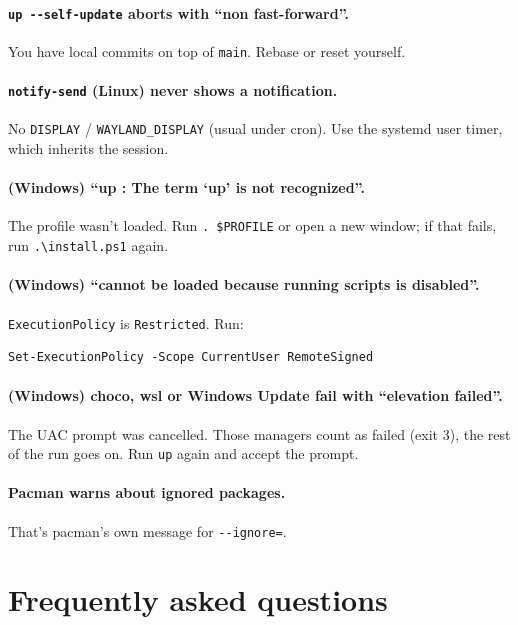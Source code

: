 \documentclass[11pt,a4paper]{article}
\begin{document}
\paragraph{\texttt{up -{}-self-update} aborts with ``non fast-forward''.}
You have local commits on top of \texttt{main}. Rebase or reset yourself.

\paragraph{\texttt{notify-send} (Linux) never shows a notification.}
No \texttt{DISPLAY} / \texttt{WAYLAND\_DISPLAY} (usual under cron). Use
the systemd user timer, which inherits the session.

\paragraph{(Windows) ``up : The term `up' is not recognized''.}
The profile wasn't loaded. Run \texttt{. \$PROFILE} or open a new
window; if that fails, run \texttt{.\textbackslash install.ps1} again.

\paragraph{(Windows) ``cannot be loaded because running scripts is disabled''.}
\texttt{ExecutionPolicy} is \texttt{Restricted}. Run:

\begin{lstlisting}[language=psplus]
Set-ExecutionPolicy -Scope CurrentUser RemoteSigned
\end{lstlisting}

\paragraph{(Windows) choco, wsl or Windows Update fail with ``elevation failed''.}
The UAC prompt was cancelled. Those managers count as failed (exit 3),
the rest of the run goes on. Run \texttt{up} again and accept the prompt.

\paragraph{Pacman warns about ignored packages.}
That's pacman's own message for \texttt{-{}-ignore=}.

\section{Frequently asked questions}\label{sec:faq}
\end{document}
